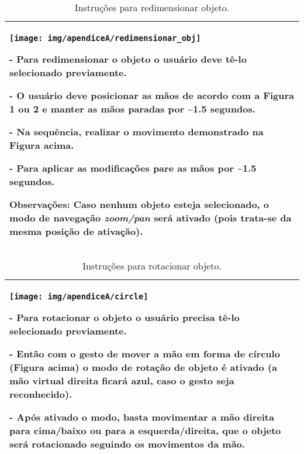 \begin{table}[!htbp]
\caption{Instruções para redimensionar objeto.}
\label{tab:instrucoes_redimensionar_objeto}
\begin{center}
\begin{tabular}{| p{14cm} |}
\hline

\begin{center}
\texttt{[image: img/apendiceA/redimensionar\_obj]}
\end{center}

- Para redimensionar o objeto o usuário deve tê-lo selecionado previamente.

- O usuário deve posicionar as mãos de acordo com a Figura 1 ou 2 e manter as mãos paradas por \textasciitilde 1.5 segundos.

- Na sequência, realizar o movimento demonstrado na Figura acima.

- Para aplicar as modificações pare as mãos por \textasciitilde 1.5 segundos. 

\textbf{Observações:} Caso nenhum objeto esteja selecionado, o modo de navegação \textit{zoom/pan} será ativado (pois trata-se da mesma posição de ativação).

\tabularnewline
\hline

\end{tabular}
\end{center}
\end{table}

\begin{table}[!htbp]
\caption{Instruções para rotacionar objeto.}
\label{tab:instrucoes_rotacionar_objeto}
\begin{center}
\begin{tabular}{| p{14cm} |}
\hline

\begin{center}
\texttt{[image: img/apendiceA/circle]}
\end{center}

- Para rotacionar o objeto o usuário precisa tê-lo selecionado previamente.

- Então com o gesto de mover a mão em forma de círculo (Figura acima) o modo de rotação de objeto é ativado (a mão virtual direita ficará azul, caso o gesto seja reconhecido).

- Após ativado o modo, basta movimentar a mão direita para cima/baixo ou para a esquerda/direita, que o objeto será rotacionado seguindo os movimentos da mão.

\tabularnewline
\hline

\end{tabular}
\end{center}
\end{table}


